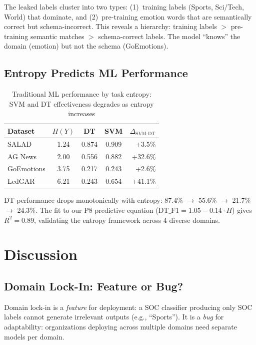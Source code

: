 \documentclass[journal]{IEEEtran}
\begin{document}
The leaked labels cluster into two types: (1)~training labels (Sports, Sci/Tech, World) that dominate, and (2)~pre-training emotion words that are semantically correct but schema-incorrect. This reveals a hierarchy: training labels $>$ pre-training semantic matches $>$ schema-correct labels. The model ``knows'' the domain (emotion) but not the schema (GoEmotions).

\subsection{Entropy Predicts ML Performance}

\begin{table}[!ht]
\centering
\caption{Traditional ML performance by task entropy: SVM and DT effectiveness degrades as entropy increases}
\label{tab:entropy}
\begin{tabular}{lcccr}
\toprule
\textbf{Dataset} & $H(Y)$ & \textbf{DT} & \textbf{SVM} & $\Delta_\text{SVM-DT}$ \\
\midrule
SALAD & 1.24 & 0.874 & 0.909 & +3.5\% \\
AG News & 2.00 & 0.556 & 0.882 & +32.6\% \\
GoEmotions & 3.75 & 0.217 & 0.243 & +2.6\% \\
LedGAR & 6.21 & 0.243 & 0.654 & +41.1\% \\
\bottomrule
\end{tabular}
\end{table}

DT performance drops monotonically with entropy: 87.4\% $\to$ 55.6\% $\to$ 21.7\% $\to$ 24.3\%. The fit to our P8 predictive equation ($\text{DT\_F1} = 1.05 - 0.14 \cdot H$) gives $R^2 = 0.89$, validating the entropy framework across 4 diverse domains.

\section{Discussion}

\subsection{Domain Lock-In: Feature or Bug?}
Domain lock-in is a \emph{feature} for deployment: a SOC classifier producing only SOC labels cannot generate irrelevant outputs (e.g., ``Sports''). It is a \emph{bug} for adaptability: organizations deploying across multiple domains need separate models per domain.
\end{document}
